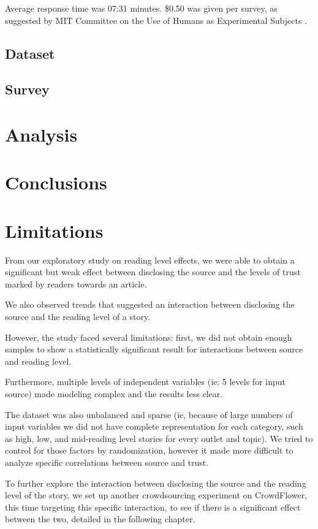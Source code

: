 Average response time was 07:31 minutes.
\$0.50 was given per survey, as suggested by MIT Committee on the Use of Humans as Experimental Subjects \cite{COUHES-turk}.
 

\subsection{Dataset}
\subsection{Survey} 
\section{Analysis}
\section{Conclusions}

\section{Limitations}

From our exploratory study on reading level effects, we were able to obtain a significant but weak effect between disclosing the source and the levels of trust marked by readers towards an article.

We also observed trends that suggested an interaction between disclosing the source and the reading level of a story.

However, the study faced several limitations: first, we did not obtain enough samples to show a statistically significant result for interactions between source and reading level.

Furthermore, multiple levels of independent variables (ie: 5 levels for input source) made modeling complex and the results less clear.

The dataset was also unbalanced and sparse (ie, because of large numbers of input variables we did not have complete representation for each category, such as high, low, and mid-reading level stories for every outlet and topic). We tried to control for those factors by randomization, however it made more difficult to analyze specific correlations between source and trust.

To further explore the interaction between disclosing the source and the reading level of the story, we set up another crowdsourcing experiment on CrowdFlower, this time targeting this specific interaction, to see if there is a significant effect between the two, detailed in the following chapter.